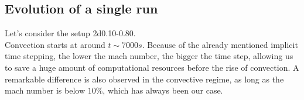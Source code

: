 \subsection{Evolution of a single run}



\begin{figure}[t]
      \centering
     \centering
	\hfill
\end{figure}

Let's consider the setup 2d0.10-0.80. \\
Convection starts at around $t \sim 7000 s$. Because of the already mentioned implicit time stepping, the lower the mach number, the bigger the time step, allowing us to save a huge amount of computational resources before the rise of convection. A remarkable difference is also observed in the convective regime, as long as the mach number is below $10 \%$, which has always been our case.\\


